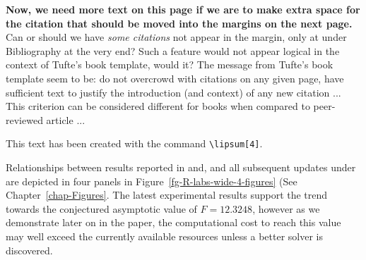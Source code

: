 {\bf Now, we need more text on this page if we are to make
extra space for the citation that should be moved into the margins on the next page.}
Can or should we have {\em some citations} not appear in the margin, only at
under Bibliography at the very end? Such a feature would not appear logical
in the context of Tufte's book template, would it?
The message from Tufte's book template seem to be: do not overcrowd with citations on any given page,
have sufficient text to justify the introduction (and context) of any new citation ... This criterion can be considered different for books when compared to peer-reviewed article ...


This text has been created with the command \verb+\lipsum[4]+.
\lipsum[1]

Relationships between results reported 
in\cite[-5ex]{Lib-OPUS-labs-1982-IEEE_TIT-Golay,Lib-OPUS-labs-1985-Phillips-Beenker}
and\cite[3ex]{Lib-OPUS-labs-1987-JourPhys-Bernasconi,Lib-OPUS-labs-1990-IEEE_TIT-Golay-skewsym}, 
and all subsequent updates under\cite[3ex]{Lib-OPUS2-labs-2014-homepage}
are depicted in four panels in Figure~\ref{fg-R-labs-wide-4-figures} (See Chapter~\ref{chap-Figures}.
The latest experimental results support the trend towards the conjectured asymptotic value of $F=12.3248$,
however as we demonstrate later on in the paper, the computational cost to reach this value may well exceed the currently available resources unless a better solver is discovered.

